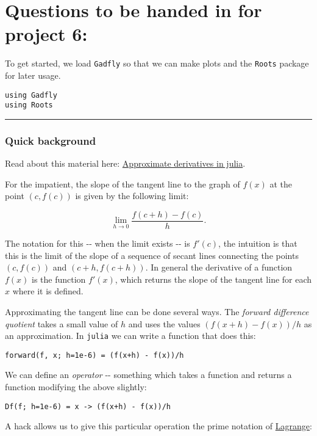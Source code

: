 \documentclass[12pt]{article}
\begin{document}
\section{Questions to be handed in for project 6:}

To get started, we load \texttt{Gadfly} so that we can make plots and
the \texttt{Roots} package for later usage.



\begin{verbatim}
using Gadfly            
using Roots
\end{verbatim}
\begin{center}\rule{3in}{0.4pt}\end{center}

\subsubsection{Quick background}

Read about this material here:
\href{http://mth229.github.io/derivatives.html}{Approximate derivatives
in julia}.

For the impatient, the slope of the tangent line to the graph of $f(x)$
at the point $(c,f(c))$ is given by the following limit:

\[
\lim_{h \rightarrow 0} \frac{f(c + h) - f(c)}{h}.
\]

The notation for this -{}- when the limit exists -{}- is $f'(c)$, the
intuition is that this is the limit of the slope of a sequence of secant
lines connecting the points $(c, f(c))$ and $(c+h, f(c+h))$. In general
the derivative of a function $f(x)$ is the function $f'(x)$, which
returns the slope of the tangent line for each $x$ where it is defined.

Approximating the tangent line can be done several ways. The
\emph{forward difference quotient} takes a small value of $h$ and uses
the values $(f(x+h) - f(x))/h$ as an approximation. In \texttt{julia} we
can write a function that does this:



\begin{verbatim}
forward(f, x; h=1e-6) = (f(x+h) - f(x))/h
\end{verbatim}
We can define an \emph{operator} -{}- something which takes a function
and returns a function modifying the above slightly:



\begin{verbatim}
Df(f; h=1e-6) = x -> (f(x+h) - f(x))/h
\end{verbatim}
A hack allows us to give this particular operation the prime notation of
\href{http://en.wikipedia.org/wiki/Notation_for_differentiation}{Lagrange}:
\end{document}
